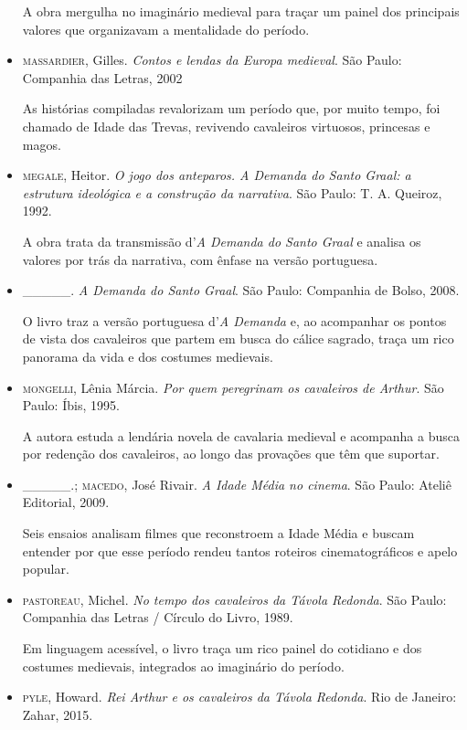 \documentclass[11pt]{extarticle}
\begin{document}
\begin{itemize}
A obra mergulha no imaginário medieval para traçar um painel dos
principais valores que organizavam a mentalidade do período.

\item\textsc{massardier}, Gilles. \textit{Contos e lendas da Europa medieval}. São
Paulo: Companhia das Letras, 2002

As histórias compiladas revalorizam um período que, por muito tempo, 
foi chamado de Idade das Trevas, revivendo cavaleiros virtuosos,
princesas e magos.

\item\textsc{megale}, Heitor. \textit{O jogo dos anteparos. A Demanda do Santo Graal: a estrutura ideológica e a construção da narrativa}. São Paulo: T. A.
Queiroz, 1992.

A obra trata da transmissão d'\emph{A Demanda do Santo Graal} e
analisa os valores por trás da narrativa, com ênfase na versão
portuguesa.

\item \_\_\_\_\_. \textit{A Demanda do Santo Graal}. São Paulo: Companhia de
Bolso, 2008.

O livro traz a versão portuguesa d'\emph{A Demanda} e, ao acompanhar
os pontos de vista dos cavaleiros que partem em busca do cálice
sagrado, traça um rico panorama da vida e dos costumes medievais.

\item \textsc{mongelli}, Lênia Márcia. \textit{Por quem peregrinam os cavaleiros de
Arthur}. São Paulo: Íbis, 1995.

A autora estuda a lendária novela de cavalaria medieval e acompanha a
busca por redenção dos cavaleiros, ao longo das provações que têm que
suportar.

\item \_\_\_\_\_.; \textsc{macedo}, José Rivair. \textit{A Idade Média no cinema}. São
Paulo: Ateliê Editorial, 2009.

Seis ensaios analisam filmes que reconstroem a Idade Média e buscam
entender por que esse período rendeu tantos roteiros cinematográficos
e apelo popular.

\item \textsc{pastoreau}, Michel. \textit{No tempo dos cavaleiros da Távola Redonda}. São Paulo: Companhia das Letras / Círculo do Livro, 1989.

Em linguagem acessível, o livro traça um rico painel do cotidiano e
dos costumes medievais, integrados ao imaginário do período.

\item \textsc{pyle}, Howard. \textit{Rei Arthur e os cavaleiros da Távola Redonda}. Rio de Janeiro: Zahar, 2015.


\end{itemize}
\end{document}
